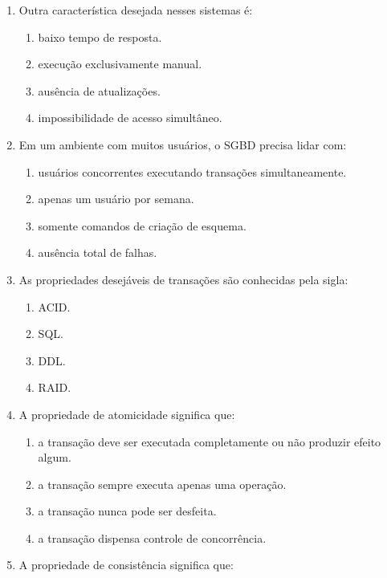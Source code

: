 \documentclass[12pt,a4paper]{article}
\begin{document}
\begin{enumerate}[label=\textbf{Q\arabic*.}]
\item Outra característica desejada nesses sistemas é:

\begin{enumerate}[label=\alph*)]
    \item baixo tempo de resposta.
    \item execução exclusivamente manual.
    \item ausência de atualizações.
    \item impossibilidade de acesso simultâneo.
\end{enumerate}

\item Em um ambiente com muitos usuários, o SGBD precisa lidar com:

\begin{enumerate}[label=\alph*)]
    \item usuários concorrentes executando transações simultaneamente.
    \item apenas um usuário por semana.
    \item somente comandos de criação de esquema.
    \item ausência total de falhas.
\end{enumerate}

\item As propriedades desejáveis de transações são conhecidas pela sigla:

\begin{enumerate}[label=\alph*)]
    \item ACID.
    \item SQL.
    \item DDL.
    \item RAID.
\end{enumerate}

\item A propriedade de atomicidade significa que:

\begin{enumerate}[label=\alph*)]
    \item a transação deve ser executada completamente ou não produzir efeito algum.
    \item a transação sempre executa apenas uma operação.
    \item a transação nunca pode ser desfeita.
    \item a transação dispensa controle de concorrência.
\end{enumerate}

\item A propriedade de consistência significa que:


\end{enumerate}
\end{document}
